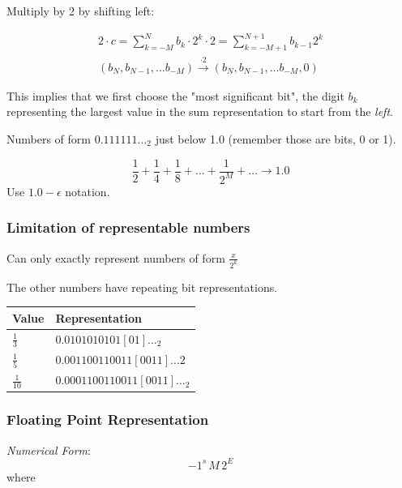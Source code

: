 \documentclass[10pt]{amsart}
\begin{document}
Multiply by 2 by shifting left:

\begin{equation}
\begin{gathered}
2  \cdot c = \sum_{k=-M}^N b_k \cdot 2^k \cdot 2 = \sum_{k=-M+1}^{N+1} b_{k-1} 2^k \\
(b_N, b_{N-1}, \dots b_{-M}) \xrightarrow{ \cdot 2} (b_N, b_{N-1}, \dots b_{-M} , 0)
\end{gathered}
\end{equation}

This implies that we first choose the "most significant bit", the digit $b_k$ representing the largest value in the sum representation to start from the \emph{left}.

Numbers of form $0.111111\dots_2$ just below 1.0 (remember those are bits, 0 or 1).

\[
\frac{1}{2} + \frac{1}{4} + \frac{1}{8} + \dots + \frac{1}{2^{M}} + \dots \to 1.0
\]
Use $1.0 - \epsilon$ notation.

\subsubsection{Limitation of representable numbers}

Can only exactly represent numbers of form $\frac{x}{2^k}$

The other numbers have repeating bit representations.

\begin{center}
	\begin{tabular}{ l | l }
		\hline
		Value & Representation \\ \hline
		$\frac{1}{3}$ & $0.0101010101[01]\dots_2$ \\ 
		$\frac{1}{5}$ & $0.001100110011[0011] \dots 2$ \\
		$\frac{1}{10}$ & $0.0001100110011[0011] \dots_2$ \\
		\hline
	\end{tabular}
\end{center}

\subsubsection{Floating Point Representation}

\emph{Numerical Form}: 
\begin{equation}
-1^s \, M \, 2^E
\end{equation}
where \\
\end{document}
